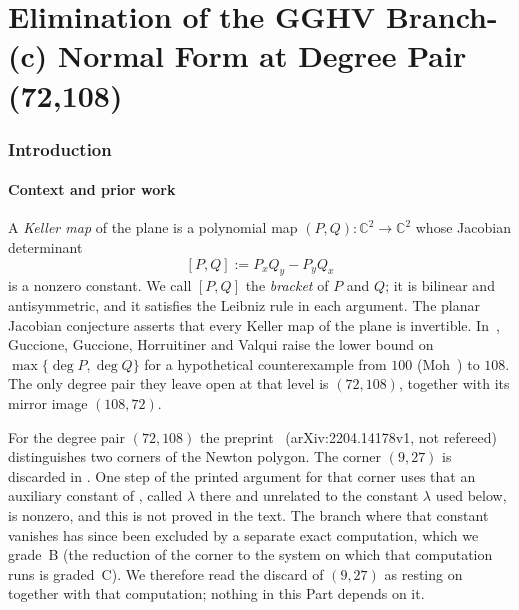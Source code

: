 \documentclass[a4paper,11pt]{article}
\theoremstyle{jsplain}
\theoremstyle{jsdef}
\theoremstyle{jsrem}
\begin{document}
\part{\texorpdfstring{Elimination of the GGHV Branch-(c) Normal Form at Degree Pair (72,108)}{Elimination of the GGHV Branch-(c) Normal Form at Degree Pair (72,108)}}

\section{Introduction}

\subsection{Context and prior work}

A \emph{Keller map} of the plane is a polynomial map $(P,Q):\mathbb{C}^2\to\mathbb{C}^2$ whose Jacobian determinant
\[
[P,Q]:=P_xQ_y-P_yQ_x
\]
is a nonzero constant. We call $[P,Q]$ the \emph{bracket} of $P$ and $Q$; it is bilinear and antisymmetric, and it satisfies the Leibniz rule in each argument. The planar Jacobian conjecture asserts that every Keller map of the plane is invertible. In~\cite{GGHV}, Guccione, Guccione, Horruitiner and Valqui raise the lower bound on $\max\{\deg P,\deg Q\}$ for a hypothetical counterexample from $100$ (Moh~\cite{Moh}) to $108$. The only degree pair they leave open at that level is $(72,108)$, together with its mirror image $(108,72)$.

For the degree pair $(72,108)$ the preprint~\cite{GGHV} (arXiv:2204.14178v1, not refereed) distinguishes two corners of the Newton polygon. The corner $(9,27)$ is discarded in \cite[Prop.~4.1, Cor.~5.7 and Thm.~5.1]{GGHV}. One step of the printed argument for that corner uses that an auxiliary constant of \cite[\S5]{GGHV}, called $\lambda$ there and unrelated to the constant $\lambda$ used below, is nonzero, and this is not proved in the text. The branch where that constant vanishes has since been excluded by a separate exact computation, which we grade~B (the reduction of the corner to the system on which that computation runs is graded~C). We therefore read the discard of $(9,27)$ as resting on \cite[\S5]{GGHV} together with that computation; nothing in this Part depends on it.
\end{document}
